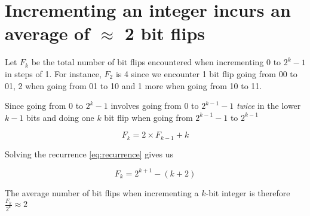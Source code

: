 \chapter{Incrementing an integer incurs an average of $\approx$ 2 bit flips}

\label{AppendixC}


Let $F_k$ be the total number of bit flips encountered when
incrementing 0 to $2^k - 1$ in steps of 1.  For instance, $F_2$ is 4
since we encounter 1 bit flip going from 00 to 01, 2 when going from
01 to 10 and 1 more when going from 10 to 11.

Since going from 0 to $2^k - 1$ involves going from 0 to $2^{k - 1} -
1$ \textit{twice} in the lower $k - 1$ bits and doing one $k$ bit flip
when going from $2^{k - 1} - 1$ to $2^{k - 1}$


\begin{equation} \label{eq:recurrence}
  F_k = 2 \times F_{k - 1} + k
\end{equation}

Solving the recurrence \ref{eq:recurrence} gives us

\begin{equation} \label{eq:solved}
  F_k = 2^{k + 1} - (k + 2)
\end{equation}

The average number of bit flips when incrementing a $k$-bit integer is
therefore $\frac{F_k}{2^k} \approx 2$

